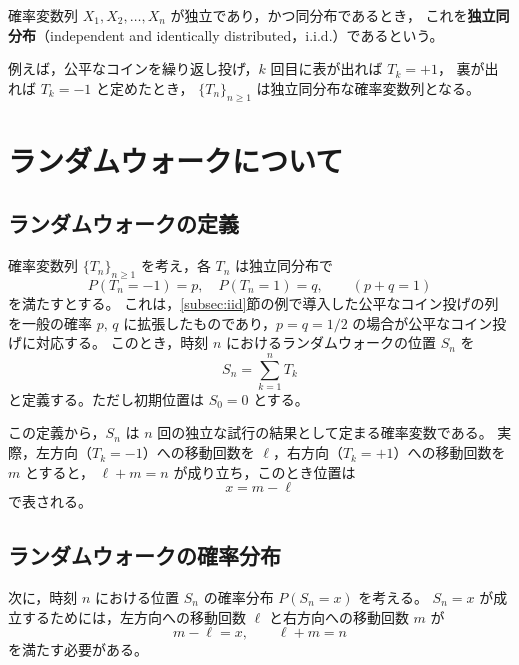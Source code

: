 \documentclass[a4j,dvipdfmx]{jsarticle}
\theoremstyle{plainnote}
\begin{document}
確率変数列 $X_1,X_2,\ldots,X_n$ が独立であり，かつ同分布であるとき，
これを\textbf{独立同分布}（independent and identically distributed，i.i.d.）であるという。

例えば，公平なコインを繰り返し投げ，$k$ 回目に表が出れば $T_k=+1$，
裏が出れば $T_k=-1$ と定めたとき，
$\{T_n\}_{n\geq 1}$ は独立同分布な確率変数列となる。





\newpage
\section{ランダムウォークについて}
\subsection{ランダムウォークの定義}

確率変数列 $\{T_n\}_{n \geq 1}$ を考え，各 $T_n$ は独立同分布で
\begin{equation}
  P(T_n = -1) = p, \quad P(T_n = 1) = q, \qquad (p + q = 1) \label{eq:rv}
\end{equation}
を満たすとする。
これは，\ref{subsec:iid}節の例で導入した公平なコイン投げの列を一般の確率 $p,\,q$ に拡張したものであり，$p = q = 1/2$ の場合が公平なコイン投げに対応する。
このとき，時刻 $n$ におけるランダムウォークの位置 $S_n$ を
\begin{equation}
  S_n = \sum_{k=1}^{n} T_k \label{eq:Sn}
\end{equation}
と定義する。ただし初期位置は $S_0 = 0$ とする。

この定義から，$S_n$ は $n$ 回の独立な試行の結果として定まる確率変数である。
実際，左方向（$T_k = -1$）への移動回数を $\ell$，右方向（$T_k = +1$）への移動回数を $m$ とすると，
$\ell + m = n$ が成り立ち，このとき位置は
\begin{equation}
  x = m - \ell \label{eq:pos}
\end{equation}
で表される。

\subsection{ランダムウォークの確率分布}

次に，時刻 $n$ における位置 $S_n$ の確率分布 $P(S_n = x)$ を考える。
$S_n = x$ が成立するためには，左方向への移動回数 $\ell$ と右方向への移動回数 $m$ が
\begin{equation}
  m - \ell = x, \qquad \ell + m = n \label{eq:lm}
\end{equation}
を満たす必要がある。
\end{document}
